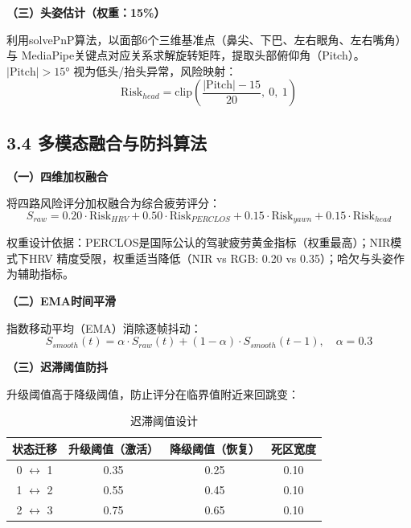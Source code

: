 \documentclass[a4paper,12pt]{article}
\begin{document}
\textbf{（三）头姿估计（权重：15\%）}

利用solvePnP算法，以面部6个三维基准点（鼻尖、下巴、左右眼角、左右嘴角）与
MediaPipe关键点对应关系求解旋转矩阵，提取头部俯仰角（Pitch）。
$|\text{Pitch}|>15°$ 视为低头/抬头异常，风险映射：
\begin{equation}
  \text{Risk}_{head} = \text{clip}\!\left(\frac{|\text{Pitch}|-15}{20},\ 0,\ 1\right)
\end{equation}

\subsection*{3.4 多模态融合与防抖算法}

\textbf{（一）四维加权融合}

将四路风险评分加权融合为综合疲劳评分：
\begin{equation}
  \boxed{
    S_{raw} = 0.20\cdot\text{Risk}_{HRV} + 0.50\cdot\text{Risk}_{PERCLOS}
             + 0.15\cdot\text{Risk}_{yawn} + 0.15\cdot\text{Risk}_{head}
  }
\end{equation}

权重设计依据：PERCLOS是国际公认的驾驶疲劳黄金指标（权重最高）；NIR模式下HRV
精度受限，权重适当降低（NIR vs RGB: 0.20 vs 0.35）；哈欠与头姿作为辅助指标。

\textbf{（二）EMA时间平滑}

指数移动平均（EMA）消除逐帧抖动：
\begin{equation}
  S_{smooth}(t) = \alpha \cdot S_{raw}(t) + (1-\alpha)\cdot S_{smooth}(t-1),\quad \alpha=0.3
\end{equation}

\textbf{（三）迟滞阈值防抖}

升级阈值高于降级阈值，防止评分在临界值附近来回跳变：

\begin{table}[H]
  \centering
  \caption{迟滞阈值设计}
  \renewcommand{\arraystretch}{1.3}
  \begin{tabular}{|c|c|c|c|}
    \hline
    \textbf{状态迁移} & \textbf{升级阈值（激活）} & \textbf{降级阈值（恢复）} & \textbf{死区宽度}\\
    \hline
    0 $\leftrightarrow$ 1 & 0.35 & 0.25 & 0.10\\
    \hline
    1 $\leftrightarrow$ 2 & 0.55 & 0.45 & 0.10\\
    \hline
    2 $\leftrightarrow$ 3 & 0.75 & 0.65 & 0.10\\
    \hline
  \end{tabular}
\end{table}
\end{document}
